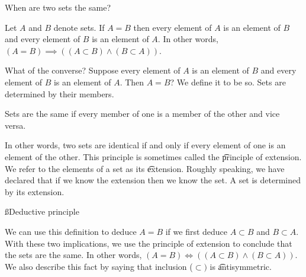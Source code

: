 


When are two sets the same?


Let $A$ and $B$ denote sets.
If $A = B$ then every element of $A$ is an element of $B$ and every element of $B$ is an element of $A$.
In other words, $(A = B) \implies ((A \subset B) \land (B \subset A))$.




What of the converse?
Suppose every element of $A$ is an element of $B$ and every element of $B$ is an element of $A$.
Then $A = B$?
We define it to be so.
Sets are determined by their members.

\begin{principle}[Extension]
	Sets are the same if every member of one is a member of the other and vice versa.
\end{principle}

In other words, two sets are identical if and only if every element of one is an element of the other.
This principle is sometimes called the \t{principle of extension}.
We refer to the elements of a set as its \t{extension}.
Roughly speaking, we have declared that if we know the extension then we know the set.
A set is determined by its extension.

\ss{Deductive principle}

We can use this definition to deduce $A= B$ if we first deduce $A \subset B$ and $B \subset A$.
With these two implications, we use the principle of extension to conclude that the sets are the same.
In other words, $(A = B) \iff ((A \subset B) \land (B \subset A))$.
We also describe this fact by saying that inclusion ($\subset)$ is \t{antisymmetric}.

